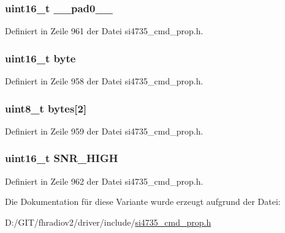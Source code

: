 \subsubsection[{\+\_\+\+\_\+pad0\+\_\+\+\_\+}]{\setlength{\rightskip}{0pt plus 5cm}uint16\+\_\+t \+\_\+\+\_\+pad0\+\_\+\+\_\+}\label{unionfm__hicut__snr__high__thres_a77132c2c26a75f5b8751b235cda23828}


Definiert in Zeile 961 der Datei si4735\+\_\+cmd\+\_\+prop.\+h.

\hypertarget{unionfm__hicut__snr__high__thres_ab0549c1b5ea980a02e7eab77e21fea49}{}
\subsubsection[{byte}]{\setlength{\rightskip}{0pt plus 5cm}uint16\+\_\+t byte}\label{unionfm__hicut__snr__high__thres_ab0549c1b5ea980a02e7eab77e21fea49}


Definiert in Zeile 958 der Datei si4735\+\_\+cmd\+\_\+prop.\+h.

\hypertarget{unionfm__hicut__snr__high__thres_a46e4c05d20a047ec169f60d3167e912e}{}
\subsubsection[{bytes}]{\setlength{\rightskip}{0pt plus 5cm}uint8\+\_\+t bytes\mbox{[}2\mbox{]}}\label{unionfm__hicut__snr__high__thres_a46e4c05d20a047ec169f60d3167e912e}


Definiert in Zeile 959 der Datei si4735\+\_\+cmd\+\_\+prop.\+h.

\hypertarget{unionfm__hicut__snr__high__thres_a58d28839dfa4529ecedf84fc6be5de83}{}
\subsubsection[{S\+N\+R\+\_\+\+H\+I\+G\+H}]{\setlength{\rightskip}{0pt plus 5cm}uint16\+\_\+t S\+N\+R\+\_\+\+H\+I\+G\+H}\label{unionfm__hicut__snr__high__thres_a58d28839dfa4529ecedf84fc6be5de83}


Definiert in Zeile 962 der Datei si4735\+\_\+cmd\+\_\+prop.\+h.



Die Dokumentation für diese Variante wurde erzeugt aufgrund der Datei\+:\begin{DoxyCompactItemize}
\item 
D\+:/\+G\+I\+T/fhradiov2/driver/include/\hyperlink{si4735__cmd__prop_8h}{si4735\+\_\+cmd\+\_\+prop.\+h}\end{DoxyCompactItemize}

